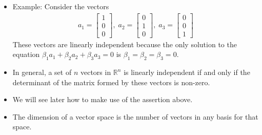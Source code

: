 \begin{frame}
    \begin{itemize}
        \item Example: Consider the vectors
        \begin{align}
            a_1 = \begin{bmatrix}
                1\\0\\0
            \end{bmatrix}, \; a_2 = \begin{bmatrix}
                0\\1\\0
            \end{bmatrix},\; a_3 = \begin{bmatrix}
                0\\0\\1
            \end{bmatrix}
        \end{align}
        These vectors are linearly independent because the only solution to the equation $\beta_1 a_1 + \beta_2 a_2 + \beta_3 a_3 = 0$ is $\beta_1 = \beta_2 = \beta_3 = 0$.    
\end{itemize}
\end{frame} 
\begin{frame}
    \begin{itemize}
    \item In general, a set of $n$ vectors in $\mathbb{R}^n$ is linearly independent if and only if the determinant of the matrix formed by these vectors is non-zero.
    \item We will see later how to make use of the  assertion above.
    \item The dimension of a vector space is the number of vectors in any basis for that space.
    \end{itemize}
\end{frame}

